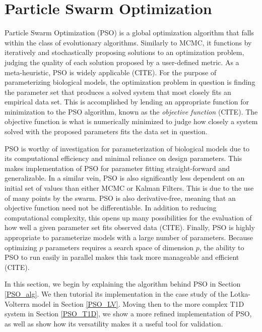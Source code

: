 \section{Particle Swarm Optimization}\label{PSO_SECT}

Particle Swarm Optimization (PSO) is a global optimization algorithm that falls within the class of evolutionary algorithms. Similarly to MCMC, it functions by iteratively and stochastically proposing solutions to an optimization problem, judging the quality of each solution proposed by a user-defined metric. As a meta-heuristic, PSO is widely applicable (CITE). For the purpose of parameterizing biological models, the optimization problem in question is finding the parameter set that produces a solved system that most closely fits an empirical data set. This is accomplished by lending an appropriate function for minimization to the PSO algorithm, known as the \emph{objective function} (CITE). The objective function is what is numerically minimized to judge how closely a system solved with the proposed parameters fits the data set in question.
\par PSO is worthy of investigation for parameterization of biological models due to its computational efficiency and minimal reliance on design parameters. This makes implementation of PSO for parameter fitting straight-forward and generalizable. In a similar vein, PSO is also significantly less dependent on an initial set of values than either MCMC or Kalman Filters. This is due to the use of many points by the swarm. PSO is also derivative-free, meaning that an objective function need not be differentiable. In addition to reducing computational complexity, this opens up many possibilities for the evaluation of how well a given parameter set fits observed data (CITE). Finally, PSO is highly appropriate to parameterize models with a large number of parameters. Because optimizing $p$ parameters requires a search space of dimension $p$, the ability to PSO to run easily in parallel makes this task more manageable and efficient (CITE). 
\par In this section, we begin by explaining the algorithm behind PSO in Section \ref{PSO_alg}. We then tutorial its implementation in the case study of the Lotka-Volterra model in Section \ref{PSO_LV}. Moving then to the more complex T1D system in Section \ref{PSO_T1D}, we show a more refined implementation of PSO, as well as show how its versatility makes it a useful tool for validation. 

